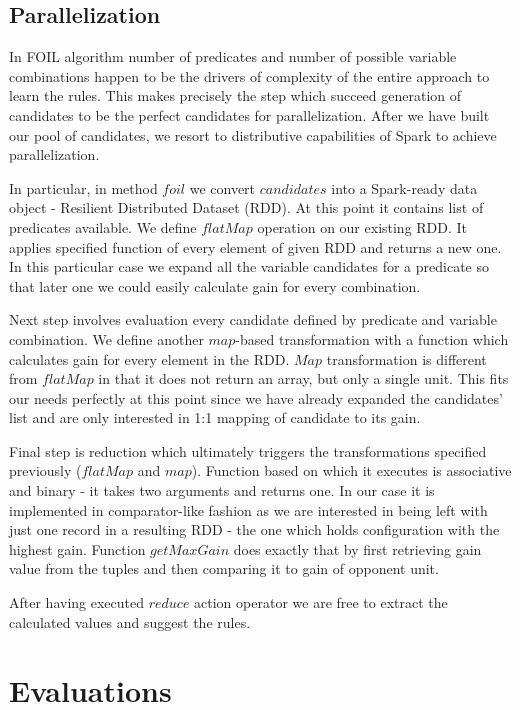 \documentclass{scrartcl}
\begin{document}
\subsection {Parallelization }

In FOIL algorithm number of predicates and number of possible variable combinations happen to be the drivers of complexity of the entire approach to learn the rules. This makes precisely the step which succeed generation of candidates to be the perfect candidates for parallelization. After we have built our pool of candidates, we resort to distributive capabilities of Spark to achieve parallelization.

In particular, in method $foil$ we convert $candidates$ into a Spark-ready data object - Resilient Distributed Dataset (RDD). At this point it contains list of predicates available. We define $flatMap$ operation on our existing RDD. It applies specified function of every element of given RDD and returns a new one. In this particular case we expand all the variable candidates for a predicate so that later one we could easily calculate gain for every combination.

Next step involves evaluation every candidate defined by predicate and variable combination. We define another $map$-based transformation with a function which calculates gain for every element in the RDD. $Map$ transformation is different from $flatMap$ in that it does not return an array, but only a single unit. This fits our needs perfectly at this point since we have already expanded the candidates' list and are only interested in 1:1 mapping of candidate to its gain.

Final step is reduction which ultimately triggers the transformations specified previously ($flatMap$ and $map$). Function based on which it executes is associative and binary - it takes two arguments and returns one. In our case it is implemented in comparator-like fashion as we are interested in being left with just one record in a resulting RDD - the one which holds configuration with the highest gain. Function $getMaxGain$ does exactly that by first retrieving gain value from the tuples and then comparing it to gain of opponent unit.

After having executed $reduce$ action operator we are free to extract the calculated values and suggest the rules.

\section{Evaluations}
\end{document}
